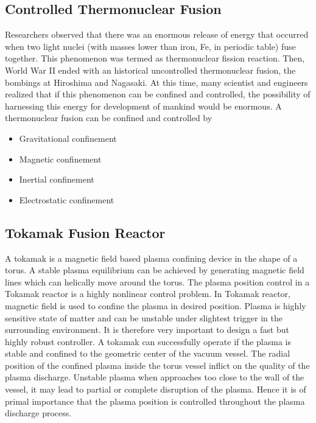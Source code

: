 \subsection{Controlled Thermonuclear Fusion}
Researchers observed that there was an enormous release of energy that occurred when two light nuclei (with masses lower than iron, Fe, in periodic table) fuse together. This phenomenon was termed as thermonuclear fission reaction. Then, World War II ended with an historical uncontrolled thermonuclear fusion, the bombings at Hiroshima and Nagasaki. At this time, many scientist and engineers realized that if this phenomenon can be confined and controlled, the possibility of harnessing this energy for development of mankind would be enormous. A thermonuclear fusion can be confined and controlled by
\begin{itemize}
	\item Gravitational confinement
	\item Magnetic confinement
	\item Inertial confinement
	\item Electrostatic confinement 
\end{itemize}

\subsection{Tokamak Fusion Reactor}
A tokamak is a magnetic field based plasma confining device in the shape of a torus. A stable plasma equilibrium can be achieved by generating magnetic field lines which can helically  move around the torus. The plasma position control in a Tokamak reactor is a highly nonlinear control problem. In Tokamak reactor, magnetic field is used to confine the plasma in desired position. Plasma is highly sensitive state of matter and can be unstable under slightest trigger in the surrounding environment. It is therefore very important to design a fast but highly robust controller. A tokamak can successfully operate if the plasma is stable and confined to the geometric center of the vacuum vessel. The radial position of the confined plasma inside the torus vessel inflict on the quality of the plasma discharge. Unstable plasma when approaches too close to the wall of the vessel, it may lead to partial or complete disruption of the plasma. Hence it is of primal importance that the plasma position is controlled throughout the plasma discharge process.

